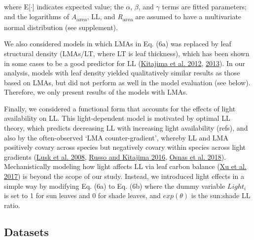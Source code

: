 \documentclass[
  12pt,
  a4paper,
,tablecaptionabove
]{scrartcl}
\begin{document}
where E{[}\(\cdot\){]} indicates expected value;
the \(\alpha\), \(\beta\), and \(\gamma\) terms are fitted parameters;
and the logarithms of \emph{A}\textsubscript{area}, LL, and \emph{R}\textsubscript{area} are assumed to have a multivariate normal distribution (see supplement).

We also considered models in which LMAs in Eq. (6a) was replaced by leaf structural density (LMAs/LT, where LT is leaf thickness), which has been shown in some cases to be a good predictor for LL (\protect\hyperlink{ref-Kitajima2012}{Kitajima et al. 2012}, \protect\hyperlink{ref-Kitajima2013}{2013}).
In our analysis, models with leaf density yielded qualitatively similar results as those based on LMAs, but did not perform as well in the model evaluation (see below).
Therefore, we only present results of the models with LMAs.

Finally, we considered a functional form that accounts for the effects of light availability on LL.
This light-dependent model is motivated by optimal LL theory, which predicts decreasing LL with increasing light availability (refs), and also by the often-observed `LMA counter-gradient', whereby LL and LMA positively covary across species but negatively covary within species across light gradients (\protect\hyperlink{ref-Lusk2008}{Lusk et al. 2008}, \protect\hyperlink{ref-Russo2016}{Russo and Kitajima 2016}, \protect\hyperlink{ref-Osnas2018}{Osnas et al. 2018}).
Mechanistically modeling how light affects LL via leaf carbon balance (\protect\hyperlink{ref-Xu2017}{Xu et al. 2017}) is beyond the scope of our study.
Instead, we introduced light effects in a simple way by modifying Eq. (6a) to Eq. (6b) where the dummy variable \(Light_i\) is set to 1 for sun leaves and 0 for shade leaves, and \(exp(\theta)\) is the sun:shade LL ratio.

\hypertarget{datasets}{%
\subsection{Datasets}\label{datasets}}
\end{document}
